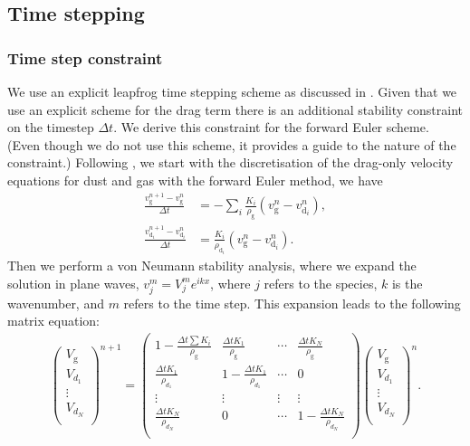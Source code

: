\documentclass[fleqn,usenatbib]{mnras}
\newcommand{\g}{\mathrm{g}}
\newcommand{\dd}{\mathrm{d}}
\begin{document}
\subsection{Time stepping}

\subsubsection{Time step constraint}

We use an explicit leapfrog time stepping scheme as discussed in
\citet{Price2018PASA...35...31P}. Given that we use an explicit scheme for the
drag term there is an additional stability constraint on the timestep \(\Delta
t\). We derive this constraint for the forward Euler scheme. (Even though we do
not use this scheme, it provides a guide to the nature of the constraint.)
Following \citet{Laibe2012MNRAS.420.2345L, Laibe2014MNRAS.444.1940L}, we start
with the discretisation of the drag-only velocity equations for dust and gas
with the forward Euler method, we have
%
\begin{align}
   \frac{v_{\g}^{n+1} - v_{\g}^n}{\Delta t} &= - \sum_i \frac{K_i}{\rho_{\g}} \left(v_{\g}^n - v_{\dd_i}^n\right), \\
   \frac{v_{\dd_i}^{n+1} - v_{\dd_i}^n}{\Delta t} &= \frac{K_i}{\rho_{\dd_i}} \left(v_{\g}^n - v_{\dd_i}^n\right).
\end{align}
%
Then we perform a von Neumann stability analysis, where we expand the solution
in plane waves, \(v_j^m = V_j^m e^{i k x}\), where \(j\) refers to the species,
\(k\) is the wavenumber, and \(m\) refers to the time step. This expansion leads
to the following matrix equation:
%
\begin{align}
   \begin{pmatrix}
      V_{\g} \\ V_{d_1} \\ \vdots \\ V_{d_N} \\
   \end{pmatrix}^{n+1} =
   \begin{pmatrix}
      1 - \frac{\Delta t \sum K_i}{\rho_{\g}} & \frac{\Delta t K_1}{\rho_{\g}} & \cdots & \frac{\Delta t K_N}{\rho_{\g}} \\
      \frac{\Delta t K_1}{\rho_{d_1}} & 1 - \frac{\Delta t K_1}{\rho_{d_1}} & \cdots & 0 \\
      \vdots & \vdots & \vdots & \vdots \\
      \frac{\Delta t K_N}{\rho_{d_N}} & 0 & \cdots & 1 - \frac{\Delta t K_N}{\rho_{d_N}} \\
   \end{pmatrix}
   \begin{pmatrix}
      V_{\g} \\ V_{d_1} \\ \vdots \\ V_{d_N} \\
   \end{pmatrix}^{n}.
\end{align}
\end{document}
